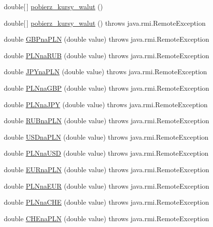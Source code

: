 \begin{DoxyCompactItemize}
double\mbox{[}$\,$\mbox{]} \hyperlink{classkantor_1_1com_1_1web_1_1service_1_1_kantor_przelicz_a9e2610a2cdb76ea7e2551786f3c0736e}{pobierz\+\_\+kursy\+\_\+walut} ()
\item 
double\mbox{[}$\,$\mbox{]} \hyperlink{classkantor_1_1com_1_1web_1_1service_1_1_kantor_przelicz_a9e2610a2cdb76ea7e2551786f3c0736e}{pobierz\+\_\+kursy\+\_\+walut} ()  throws java.\+rmi.\+Remote\+Exception
\item 
double \hyperlink{classkantor_1_1com_1_1web_1_1service_1_1_kantor_przelicz_a64b58db5e686a08b4b1af648eb781a1c}{G\+B\+Pna\+P\+L\+N} (double value)  throws java.\+rmi.\+Remote\+Exception
\item 
double \hyperlink{classkantor_1_1com_1_1web_1_1service_1_1_kantor_przelicz_ad68cbeb18f18cd02c3b4b571da0e06fa}{P\+L\+Nna\+R\+U\+B} (double value)  throws java.\+rmi.\+Remote\+Exception
\item 
double \hyperlink{classkantor_1_1com_1_1web_1_1service_1_1_kantor_przelicz_a9e6f2e71874e1dd7b520d2da4427bae8}{J\+P\+Yna\+P\+L\+N} (double value)  throws java.\+rmi.\+Remote\+Exception
\item 
double \hyperlink{classkantor_1_1com_1_1web_1_1service_1_1_kantor_przelicz_ad0840077798f333f948772590d1a402a}{P\+L\+Nna\+G\+B\+P} (double value)  throws java.\+rmi.\+Remote\+Exception
\item 
double \hyperlink{classkantor_1_1com_1_1web_1_1service_1_1_kantor_przelicz_a7706e3a08c1b8ce3775506c4530d1bf7}{P\+L\+Nna\+J\+P\+Y} (double value)  throws java.\+rmi.\+Remote\+Exception
\item 
double \hyperlink{classkantor_1_1com_1_1web_1_1service_1_1_kantor_przelicz_a11c3958baf84a3a96dbc9290890b6c4e}{R\+U\+Bna\+P\+L\+N} (double value)  throws java.\+rmi.\+Remote\+Exception
\item 
double \hyperlink{classkantor_1_1com_1_1web_1_1service_1_1_kantor_przelicz_ad263683559db773d4ccb28e14090824f}{U\+S\+Dna\+P\+L\+N} (double value)  throws java.\+rmi.\+Remote\+Exception
\item 
double \hyperlink{classkantor_1_1com_1_1web_1_1service_1_1_kantor_przelicz_aea3a5dd74cf10d0c9ce1bf04b94078c8}{P\+L\+Nna\+U\+S\+D} (double value)  throws java.\+rmi.\+Remote\+Exception
\item 
double \hyperlink{classkantor_1_1com_1_1web_1_1service_1_1_kantor_przelicz_af204b150c62165c836a1a0afd10c16b7}{E\+U\+Rna\+P\+L\+N} (double value)  throws java.\+rmi.\+Remote\+Exception
\item 
double \hyperlink{classkantor_1_1com_1_1web_1_1service_1_1_kantor_przelicz_acfc0cd42fb64c5f26d468245cf0fe3b6}{P\+L\+Nna\+E\+U\+R} (double value)  throws java.\+rmi.\+Remote\+Exception
\item 
double \hyperlink{classkantor_1_1com_1_1web_1_1service_1_1_kantor_przelicz_afa953802446690d409e1df5361729fc0}{P\+L\+Nna\+C\+H\+E} (double value)  throws java.\+rmi.\+Remote\+Exception
\item 
double \hyperlink{classkantor_1_1com_1_1web_1_1service_1_1_kantor_przelicz_acff8492d50d84cf718bca4c8b499d36a}{C\+H\+Ena\+P\+L\+N} (double value)  throws java.\+rmi.\+Remote\+Exception
\end{DoxyCompactItemize}


